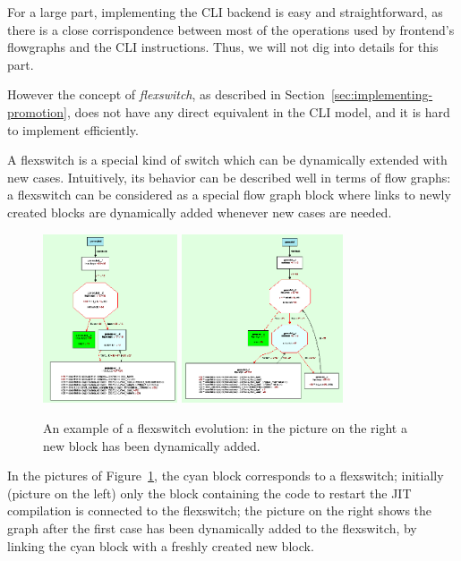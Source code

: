 For a large part, implementing the CLI backend is easy and straightforward, as
there is a close corrispondence between most of the operations used by
frontend's flowgraphs and the CLI instructions.  Thus, we will not dig into
details for this part.

However the concept of \emph{flexswitch}, as described in
Section~\ref{sec:implementing-promotion}, does not have any direct equivalent
in the CLI model, and it is hard to implement efficiently.

A flexswitch is a special kind of switch which can be dynamically
extended with new cases.  Intuitively, its behavior can be described
well in terms of flow graphs: a flexswitch can be considered 
as a special flow graph block where links to newly created blocks are
dynamically added whenever new cases are needed. 

\begin{figure}[h]
\begin{center}
\includegraphics[height=5cm]{flexswitch1}
\includegraphics[height=5cm]{flexswitch2}
\caption{An example of a flexswitch evolution: in the picture on the
  right a new block has been dynamically added.}\label{flexswitch-fig}
\end{center}
\end{figure}

In the pictures of Figure~\ref{flexswitch-fig}, the cyan block
corresponds to a flexswitch; initially (picture on the left) 
only the block containing the code to restart the JIT compilation
is connected to the flexswitch; the picture on the right
shows the graph after the first case has been dynamically added to the flexswitch,
by linking the cyan block with a freshly created new block.


